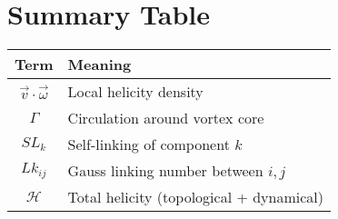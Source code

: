 \documentclass[11pt]{article}
\begin{document}
    \section*{Summary Table}
    \begin{tabular}{|c|l|}
        \hline
        \textbf{Term} & \textbf{Meaning} \\
        \hline
        $\vec{v} \cdot \vec{\omega}$ & Local helicity density \\
        $\Gamma$ & Circulation around vortex core \\
        $SL_k$ & Self-linking of component $k$ \\
        $Lk_{ij}$ & Gauss linking number between $i,j$ \\
        $\mathcal{H}$ & Total helicity (topological + dynamical) \\
        \hline
    \end{tabular}
\end{document}
